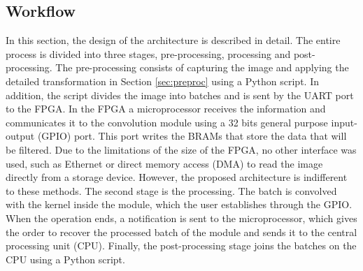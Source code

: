\documentclass[conference,compsoc]{IEEEtran}
\begin{document}
\subsection{Workflow}
In this section, the design of the architecture is described in detail. The
entire process is divided into three stages, pre-processing, processing and
post-processing. The pre-processing consists of capturing the image and applying
the detailed transformation in Section \ref{sec:preproc} using a Python script.
In addition, the script divides the image into batches and is sent by the UART
port to the FPGA. In the FPGA a microprocessor receives the information and
communicates it to the convolution module using a 32 bits general purpose
input-output (GPIO) port. This port writes the BRAMs that store the data that
will be filtered. Due to the limitations of the size of the FPGA, no other
interface was used, such as Ethernet or direct memory access (DMA) to read the
image directly from a storage device. However, the proposed architecture is
indifferent to these methods. The second stage is the processing. The batch is
convolved with the kernel inside the module, which the user establishes through
the GPIO. When the operation ends, a notification is sent to the microprocessor,
which gives the order to recover the processed batch of the module and sends it
to the central processing unit (CPU). Finally, the post-processing stage joins
the batches on the CPU using a Python script.



\end{document}
